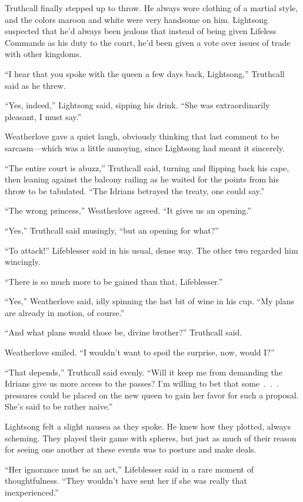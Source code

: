 Truthcall finally stepped up to throw. He always wore clothing of a martial style, and the colors maroon and white were very handsome on him. Lightsong suspected that he’d always been jealous that instead of being given Lifeless Commands as his duty to the court, he’d been given a vote over issues of trade with other kingdoms.

“I hear that you spoke with the queen a few days back, Lightsong,” Truthcall said as he threw.

“Yes, indeed,” Lightsong said, sipping his drink. “She was extraordinarily pleasant, I must say.”

Weatherlove gave a quiet laugh, obviously thinking that last comment to be sarcasm—which was a little annoying, since Lightsong had meant it sincerely.

“The entire court is abuzz,” Truthcall said, turning and flipping back his cape, then leaning against the balcony railing as he waited for the points from his throw to be tabulated. “The Idrians betrayed the treaty, one could say.”

“The wrong princess,” Weatherlove agreed. “It gives us an opening.”

“Yes,” Truthcall said musingly, “but an opening for what?”

“To attack!” Lifeblesser said in his usual, dense way. The other two regarded him wincingly.

“There is so much more to be gained than that, Lifeblesser.”

“Yes,” Weatherlove said, idly spinning the last bit of wine in his cup. “My plans are already in motion, of course.”

“And what plans would those be, divine brother?” Truthcall said.

Weatherlove smiled. “I wouldn’t want to spoil the surprise, now, would I?”

“That depends,” Truthcall said evenly. “Will it keep me from demanding the Idrians give us more access to the passes? I’m willing to bet that some~.~.~. pressures could be placed on the new queen to gain her favor for such a proposal. She’s said to be rather naive.”

Lightsong felt a slight nausea as they spoke. He knew how they plotted, always scheming. They played their game with spheres, but just as much of their reason for seeing one another at these events was to posture and make deals.

“Her ignorance must be an act,” Lifeblesser said in a rare moment of thoughtfulness. “They wouldn’t have sent her if she was really that inexperienced.”

